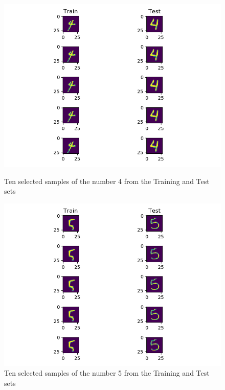 \documentclass[10pt,letterpaper]{article}
\begin{document}
	\begin{figure}[H]
		\centering
		\includegraphics[width=\linewidth]{imgs/digit-4}
		\caption{Ten selected samples of the number 4 from the Training and Test sets}
		\label{fig:digit-4}
		\endminipage\hfill
		\centering
		\includegraphics[width=\linewidth]{imgs/digit-5}
		\caption{Ten selected samples of the number 5 from the Training and Test sets}
		\label{fig:digit-5}
		\endminipage\hfill
	\end{figure}
\end{document}
